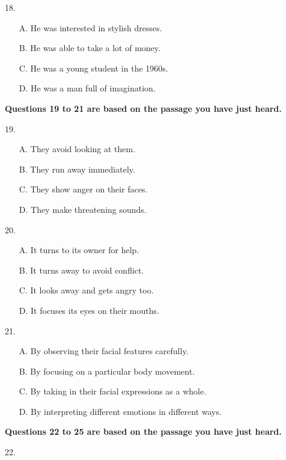 \documentclass[UTF8,11pt]{ctexart}
\begin{document}
18.


\begin{itemize}[leftmargin=2em,itemsep=.2em,topsep=.4em]\item[A.] He was interested in stylish dresses.
\item[B.] He was able to take a lot of money.
\item[C.] He was a young student in the 1960s.
\item[D.] He was a man full of imagination.
\end{itemize}

\textbf{Questions 19 to 21 are based on the passage you have just heard.}


19.


\begin{itemize}[leftmargin=2em,itemsep=.2em,topsep=.4em]\item[A.] They avoid looking at them.
\item[B.] They run away immediately.
\item[C.] They show anger on their faces.
\item[D.] They make threatening sounds.
\end{itemize}

20.


\begin{itemize}[leftmargin=2em,itemsep=.2em,topsep=.4em]\item[A.] It turns to its owner for help.
\item[B.] It turns away to avoid conflict.
\item[C.] It looks away and gets angry too.
\item[D.] It focuses its eyes on their mouths.
\end{itemize}

21.


\begin{itemize}[leftmargin=2em,itemsep=.2em,topsep=.4em]\item[A.] By observing their facial features carefully.
\item[B.] By focusing on a particular body movement.
\item[C.] By taking in their facial expressions as a whole.
\item[D.] By interpreting different emotions in different ways.
\end{itemize}

\textbf{Questions 22 to 25 are based on the passage you have just heard.}


22.
\end{document}
